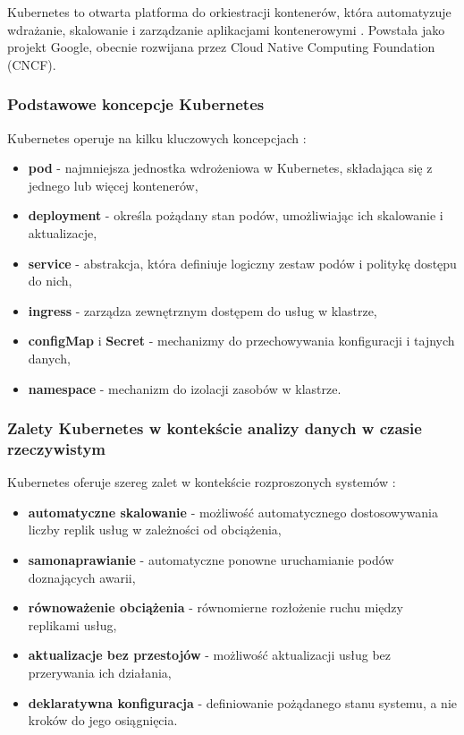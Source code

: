 Kubernetes to otwarta platforma do orkiestracji kontenerów, która automatyzuje wdrażanie, skalowanie i zarządzanie aplikacjami
kontenerowymi \cite{kubernetes}. Powstała jako projekt Google, obecnie rozwijana przez Cloud Native Computing Foundation (CNCF).

\subsubsection{Podstawowe koncepcje Kubernetes}
\label{subsubsec:podstawy_kubernetes}

Kubernetes operuje na kilku kluczowych koncepcjach \cite{kubernetes_concepts}:

\begin{itemize}
    \item \textbf{pod} - najmniejsza jednostka wdrożeniowa w Kubernetes, składająca się z jednego lub więcej kontenerów,
    \item \textbf{deployment} - określa pożądany stan podów, umożliwiając ich skalowanie i aktualizacje,
    \item \textbf{service} - abstrakcja, która definiuje logiczny zestaw podów i politykę dostępu do nich,
    \item \textbf{ingress} - zarządza zewnętrznym dostępem do usług w klastrze,
    \item \textbf{configMap} i \textbf{Secret} - mechanizmy do przechowywania konfiguracji i tajnych danych,
    \item \textbf{namespace} - mechanizm do izolacji zasobów w klastrze.
\end{itemize}

\subsubsection{Zalety Kubernetes w kontekście analizy danych w czasie rzeczywistym}
\label{subsubsec:zalety_kubernetes}

Kubernetes oferuje szereg zalet w kontekście rozproszonych systemów \cite{kubernetes_benefits}:

\begin{itemize}
    \item \textbf{automatyczne skalowanie} - możliwość automatycznego dostosowywania liczby replik usług w zależności od obciążenia,
    \item \textbf{samonaprawianie} - automatyczne ponowne uruchamianie podów doznających awarii,
    \item \textbf{równoważenie obciążenia} - równomierne rozłożenie ruchu między replikami usług,
    \item \textbf{aktualizacje bez przestojów} - możliwość aktualizacji usług bez przerywania ich działania,
    \item \textbf{deklaratywna konfiguracja} - definiowanie pożądanego stanu systemu, a nie kroków do jego osiągnięcia.
\end{itemize}

